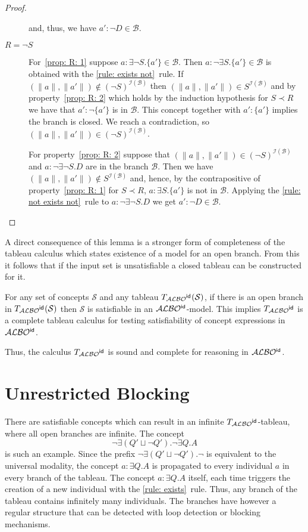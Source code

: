 \documentclass[leqno
,pdflatex
,prodmode
,acmtocl
]{acmsmall}
\newcommand{\mathcmd}[1]{\ensuremath{#1}\xspace}
\newcommand{\dlfont}{\mathcal}
\newcommand{\dl}[1]{\mathcmd{\dlfont{#1}}}
\newcommand{\idRole}{\mathcmd{\textsf{\upshape\mdseries id}}}
\newcommand{\ALBOid}{\dl{ALBO\smash[t]{\mbox{${}^{\idRole}$}}}}
\def\Not{\neg}
\def\Or{\sqcup}
\newcommand{\branch}[1]{\seg{#1}}
\newcommand{\seg}[1]{\mathcmd{\mathcal{#1}}}
\newcommand{\indiv}{a}
\newcommand{\cname}{A}
\newcommand{\rname}{Q}
\newcommand{\I}{\mathcal{I}}
\newcommand{\IB}{{\I(\branch{B})}}
\begin{document}
\begin{proof}
\begin{description}
    and, thus, we have $\indiv':\Not D\in\branch{B}$.
 \item[$R=\Not S$] For~\eqref{prop: R: 1} suppose $\indiv:\exists\Not S.\{\indiv'\}\in\branch{B}$. 
    Then $\indiv:\Not\exists S.\{\indiv'\}\in\branch{B}$ is obtained with the \eqref{rule: exists not}~rule. 
    If $(\|\indiv\|,\|\indiv'\|)\notin(\Not S)^\IB$
    then $(\|\indiv\|,\|\indiv'\|)\in S^\IB$ and by property~\eqref{prop: R: 2} which holds
    by the induction hypothesis for $S\prec R$ we have that
    $\indiv':\Not\{\indiv'\}$ is in $\branch{B}$. This concept together with $\indiv':\{\indiv'\}$ implies
    the branch is closed. We reach a contradiction, so $(\|\indiv\|,\|\indiv'\|)\in(\Not S)^\IB$.

    For property~\eqref{prop: R: 2} suppose that $(\|\indiv\|,\|\indiv'\|)\in(\Not S)^\IB$
    and $\indiv:\Not\exists\Not S.D$ are in the branch $\branch{B}$.
    Then we have $(\|\indiv\|,\|\indiv'\|)\notin  S^\IB$ and, hence,
    by the contrapositive of property~\eqref{prop: R: 1} for $S\prec R$,
    $\indiv:\exists S.\{\indiv'\}$ is not in $\branch{B}$.
    Applying the 
    \eqref{rule: not exists not}~rule to $\indiv:\Not\exists\Not S.D$ we
get
    $\indiv':\Not D\in\branch{B}$.
\end{description}
\end{proof}
A direct consequence of this lemma is a stronger form of completeness
of the tableau calculus which states existence of a model for an open
branch.
From this it follows that if the input set is unsatisfiable a closed tableau
can be constructed for it.
\begin{theorem}
[Completeness]\label{theorem: completeness} For any set of concepts
$\mathcal{S}$ and any tableau $T_\ALBOid(\mathcal{S})$, if there
is an open branch in $T_\ALBOid(\mathcal{S})$ then $\mathcal{S}$
is satisfiable in an \ALBOid-model.
This implies
$T_\ALBOid$ is a complete tableau calculus for testing satisfiability
of concept expressions in \ALBOid.
\end{theorem}
Thus, the calculus $T_\ALBOid$ is sound and complete for reasoning in \ALBOid.

\section{Unrestricted Blocking}
\label{section_blocking}

There are satisfiable concepts which can result in an infinite
$T_\ALBOid$-tableau, where all open branches are infinite.
The concept \[\Not\exists(Q'\Or\Not Q').\Not\exists \rname.\cname\] is such an
example. 
Since the prefix 
$\Not\exists(Q'\Or\Not Q').\Not$ is equivalent to the universal modality,
the concept $\indiv:\exists \rname.\cname$ is propagated to every
individual $\indiv$ in every branch of the tableau.
The concept $\indiv:\exists \rname.\cname$ itself, each time triggers the creation
of a new individual with the \eqref{rule: exists}~rule.
Thus, any branch of the tableau contains infinitely
many individuals. The branches
have however a regular structure that can be detected with loop
detection or blocking mechanisms.
\end{document}
